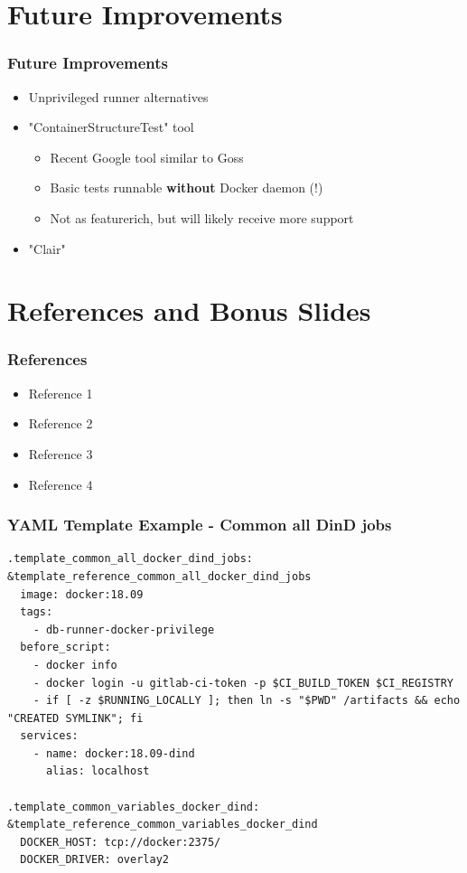 \documentclass[14pt,aspectratio=169]{beamer}
\begin{document}
\section{Future Improvements}

\begin{frame}
  \frametitle{Future Improvements}
  \begin{itemize}
    \item Unprivileged runner alternatives
    \item "ContainerStructureTest" tool
    \begin{itemize}
      \item Recent Google tool similar to Goss
      \item Basic tests runnable \textbf{without} Docker daemon (!)
      \item Not as featurerich, but will likely receive more support
    \end{itemize}
    \item "Clair"
  \end{itemize}
\end{frame}

\section{}

\cernSplashWhite

\section{References and Bonus Slides}

\begin{frame}
  \frametitle{References}
  \begin{itemize}
  \item Reference 1
  \item Reference 2
  \item Reference 3
  \item Reference 4
  \end{itemize}
\end{frame}

\begin{frame}[fragile]
  \frametitle{YAML Template Example - Common all DinD jobs}
  \begin{verbatim}
.template_common_all_docker_dind_jobs: &template_reference_common_all_docker_dind_jobs
  image: docker:18.09
  tags:
    - db-runner-docker-privilege
  before_script:
    - docker info
    - docker login -u gitlab-ci-token -p $CI_BUILD_TOKEN $CI_REGISTRY
    - if [ -z $RUNNING_LOCALLY ]; then ln -s "$PWD" /artifacts && echo "CREATED SYMLINK"; fi
  services:
    - name: docker:18.09-dind
      alias: localhost

.template_common_variables_docker_dind: &template_reference_common_variables_docker_dind
  DOCKER_HOST: tcp://docker:2375/
  DOCKER_DRIVER: overlay2
  \end{verbatim}
\end{frame}
\end{document}
